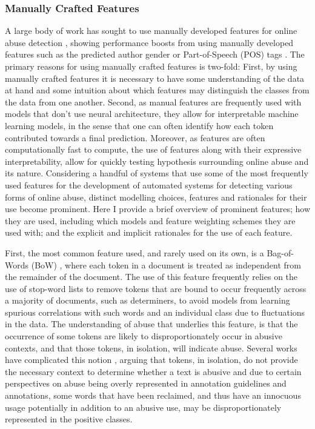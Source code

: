 \subsubsection{Manually Crafted Features}

A large body of work has sought to use manually developed features for online abuse detection \citep{Davidson:2017,Waseem:2017,Ibrohim:2019,Vega:2019,Wiegand:2018,Tian:2020,Kumar:2019,Fortuna:2018}, showing performance boosts from using manually developed features such as the predicted author gender \citep{Waseem-Hovy:2016} or Part-of-Speech (POS) tags \citep{Davidson:2017}. The primary reasons for using manually crafted features is two-fold: First, by using manually crafted features it is necessary to have some understanding of the data at hand and some intuition about which features may distinguish the classes from the data from one another. Second, as manual features are frequently used with models that don't use neural architecture, they allow for interpretable machine learning models, in the sense that one can often identify how each token contributed towards a final prediction. Moreover, as features are often computationally fast to compute, the use of features along with their expressive interpretability, allow for quickly testing hypothesis surrounding online abuse and its nature.
Considering a handful of systems that use some of the most frequently used features for the development of automated systems for detecting various forms of online abuse, distinct modelling choices, features and rationales for their use become prominent. Here I provide a brief overview of prominent features; how they are used, including which models and feature weighting schemes they are used with; and the explicit and implicit rationales for the use of each feature.

First, the most common feature used, and rarely used on its own, is a Bag-of-Words (BoW) \citep{Fortuna:2018,Davidson:2017}, where each token in a document is treated as independent from the remainder of the document. The use of this feature frequently relies on the use of stop-word lists to remove tokens that are bound to occur frequently across a majority of documents, such as determiners, to avoid models from learning spurious correlations with such words and an individual class due to fluctuations in the data. The understanding of abuse that underlies this feature, is that the occurrence of some tokens are likely to disproportionately occur in abusive contexts, and that those tokens, in isolation, will indicate abuse. Several works have complicated this notion \citep[e.g.]{Waseem:2018,Davidson:2019}, arguing that tokens, in isolation, do not provide the necessary context to determine whether a text is abusive and due to certain perspectives on abuse being overly represented \citep{Waseem:2016} in annotation guidelines and annotations, some words that have been reclaimed, and thus have an innocuous usage potentially in addition to an abusive use, may be disproportionately represented in the positive classes.

